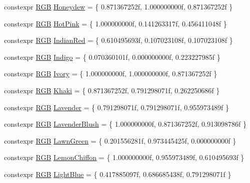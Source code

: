 \begin{DoxyCompactItemize}
\item 
constexpr \mbox{\hyperlink{structmage_1_1_r_g_b}{R\+GB}} \mbox{\hyperlink{namespacemage_1_1color_a6fdd1089a1f0d6a77b9b6298907e3361}{Honeydew}} = \{ 0.\+871367252f, 1.\+000000000f, 0.\+871367252f \}
\item 
constexpr \mbox{\hyperlink{structmage_1_1_r_g_b}{R\+GB}} \mbox{\hyperlink{namespacemage_1_1color_a64c422466ccc5c44c1c4a0e6f435a3c3}{Hot\+Pink}} = \{ 1.\+000000000f, 0.\+141263317f, 0.\+456411048f \}
\item 
constexpr \mbox{\hyperlink{structmage_1_1_r_g_b}{R\+GB}} \mbox{\hyperlink{namespacemage_1_1color_ac72ec1deca799c7ea8a266178fcff437}{Indian\+Red}} = \{ 0.\+610495693f, 0.\+107023108f, 0.\+107023108f \}
\item 
constexpr \mbox{\hyperlink{structmage_1_1_r_g_b}{R\+GB}} \mbox{\hyperlink{namespacemage_1_1color_a6c11642f5d2e292242db7ae8098ad2fe}{Indigo}} = \{ 0.\+070360101f, 0.\+000000000f, 0.\+223227985f \}
\item 
constexpr \mbox{\hyperlink{structmage_1_1_r_g_b}{R\+GB}} \mbox{\hyperlink{namespacemage_1_1color_a523d55e266b6dd337cd2865ee29754fc}{Ivory}} = \{ 1.\+000000000f, 1.\+000000000f, 0.\+871367252f \}
\item 
constexpr \mbox{\hyperlink{structmage_1_1_r_g_b}{R\+GB}} \mbox{\hyperlink{namespacemage_1_1color_a2be9259999ab5e4e4e3c46c0c12cd5d7}{Khaki}} = \{ 0.\+871367252f, 0.\+791298071f, 0.\+262250686f \}
\item 
constexpr \mbox{\hyperlink{structmage_1_1_r_g_b}{R\+GB}} \mbox{\hyperlink{namespacemage_1_1color_aa245a4aee08d18691655685f3918491d}{Lavender}} = \{ 0.\+791298071f, 0.\+791298071f, 0.\+955973489f \}
\item 
constexpr \mbox{\hyperlink{structmage_1_1_r_g_b}{R\+GB}} \mbox{\hyperlink{namespacemage_1_1color_a1931b51916699fe6043528085a744912}{Lavender\+Blush}} = \{ 1.\+000000000f, 0.\+871367252f, 0.\+913098786f \}
\item 
constexpr \mbox{\hyperlink{structmage_1_1_r_g_b}{R\+GB}} \mbox{\hyperlink{namespacemage_1_1color_abb5025143228ccad532fc59bc3e0326c}{Lawn\+Green}} = \{ 0.\+201556281f, 0.\+973445425f, 0.\+000000000f \}
\item 
constexpr \mbox{\hyperlink{structmage_1_1_r_g_b}{R\+GB}} \mbox{\hyperlink{namespacemage_1_1color_a978bfddad2cebc2e3016ae777e2c420d}{Lemon\+Chiffon}} = \{ 1.\+000000000f, 0.\+955973489f, 0.\+610495693f \}
\item 
constexpr \mbox{\hyperlink{structmage_1_1_r_g_b}{R\+GB}} \mbox{\hyperlink{namespacemage_1_1color_a1890b43e1d4774c83e7cf5a4dcbf9c65}{Light\+Blue}} = \{ 0.\+417885097f, 0.\+686685438f, 0.\+791298071f \}

\end{DoxyCompactItemize}

